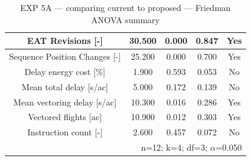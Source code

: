 \begin{table}[htbp]
\caption{EXP 5A — comparing current to proposed — Friedman ANOVA summary}
\begin{center}
\footnotesize
\setlength{\tabcolsep}{3pt}
\renewcommand{\arraystretch}{1.000}
\begin{tabular}{|c|c|c|c|c|}
\hline
EAT Revisions [-] & 30.500 & 0.000 & 0.847 & Yes \\
\hline
Sequence Position Changes [-] & 25.200 & 0.000 & 0.700 & Yes \\
\hline
Delay energy cost [\%] & 1.900 & 0.593 & 0.053 & No \\
\hline
Mean total delay [s/ac] & 5.000 & 0.172 & 0.139 & No \\
\hline
Mean vectoring delay [s/ac] & 10.300 & 0.016 & 0.286 & Yes \\
\hline
Vectored flights [ac] & 10.900 & 0.012 & 0.303 & Yes \\
\hline
Instruction count [-] & 2.600 & 0.457 & 0.072 & No \\
\hline
\multicolumn{5}{r}{n=12; k=4; df=3; $\alpha$=0.050}\\
\end{tabular}
\label{tab:exp\_5a\_comparing\_current\_to\_proposed\_friedman}
\end{center}
\end{table}